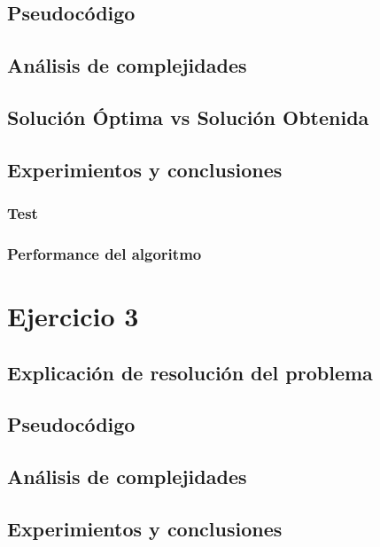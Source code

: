 \documentclass[12pt, a4paper]{article}
\begin{document}
\subsection{Pseudoc\'odigo}

\subsection{An\'alisis de complejidades}

\subsection{Soluci\'on \'Optima vs Soluci\'on Obtenida}

\subsection{Experimientos y conclusiones}
\subsubsection[2.5]{Test}
%
\subsubsection[2.5]{Performance del algoritmo}
%

\newpage
\section{Ejercicio 3} 
\subsection{Explicaci\'on de resoluci\'on del problema}

\subsection{Pseudoc\'odigo}

\subsection{An\'alisis de complejidades}

%
\subsection{Experimientos y conclusiones}
\end{document}
